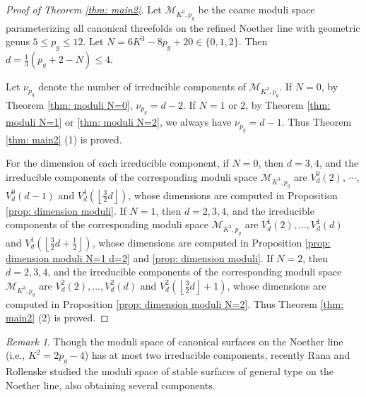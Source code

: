 \documentclass[a4paper,11pt]{amsart}
\newcommand{\M}{\ensuremath{\mathcal{M}}}
\theoremstyle{definition}
\theoremstyle{remark}
\newtheorem{remark}[thm]{Remark}
\numberwithin{equation}{section}
\begin{document}
\begin{proof} [Proof of Theorem \ref{thm: main2}]
    Let $\M_{K^3, p_g}$ be the coarse moduli space parameterizing all canonical threefolds on the refined Noether line with geometric genus $5 \le p_g \le 12$. Let $N = 6K^3 - 8p_g + 20 \in \{0, 1, 2\}$. Then $d = \frac{1}{3} (p_g + 2 - N) \le 4$.

    Let $\nu_{p_g}$ denote the number of irreducible components of $\M_{K^3, p_g}$. If $N = 0$, by Theorem \ref{thm: moduli N=0}, $\nu_{p_g} = d - 2$. If $N = 1$ or $2$, by Theorem \ref{thm: moduli N=1}  or \ref{thm: moduli N=2}, we always have $\nu_{p_g} = d - 1$. Thus Theorem \ref{thm: main2} (1) is proved.

    For the dimension of each irreducible component, if $N = 0$, then $d = 3, 4$, and the irreducible components of the corresponding moduli space $\M_{K^3, p_g}$ are $V_d^0(2)$, $\cdots$, $V_d^0(d - 1)$ and $V^1_d\left( \left\lfloor \frac32 d\right\rfloor \right)$, whose dimensions are computed in Proposition \ref{prop: dimension moduli}.
    If $N = 1$, then $d =2, 3, 4$, and the irreducible components of the corresponding moduli space $\M_{K^3, p_g}$ are $V_d^1(2),\dots,V_d^1(d)$ and $V^1_d\left( \left\lfloor \frac32 d + \frac12 \right\rfloor \right)$, whose dimensions are computed in Proposition \ref{prop: dimension moduli N=1 d=2} and \ref{prop: dimension moduli}. If $N = 2$, then $d = 2, 3, 4$, and the irreducible components of the corresponding moduli space $\M_{K^3, p_g}$ are $V_d^2(2),\dots,V_d^2(d)$ and $V^2_d\left( \left\lfloor \frac32 d \right\rfloor + 1 \right)$, whose dimensions are computed in Proposition \ref{prop: dimension moduli N=2}. Thus Theorem \ref{thm: main2} (2) is proved.
\end{proof}

\begin{remark}
	Though the moduli space of canonical surfaces on the Noether line (i.e., $K^2 = 2p_g - 4$) has at most two irreducible components, recently Rana and Rollenske \cite{RR} studied the moduli space of stable surfaces of general type on the Noether line, also obtaining several components.
\end{remark}
\end{document}
